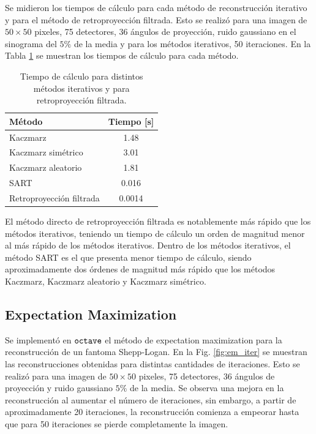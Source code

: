 \documentclass[letterpaper,12pt]{article}
\theoremstyle{plain}
\begin{document}
Se midieron los tiempos de cálculo para cada método de reconstrucción iterativo y para el método de retroproyección filtrada. Esto se realizó para una imagen de $50\times50$ pixeles, 75 detectores, 36 ángulos de proyección, ruido gaussiano en el sinograma del $5\%$ de la media y para los métodos iterativos, 50 iteraciones. En la Tabla \ref{tab:tiempos} se muestran los tiempos de cálculo para cada método. 

\begin{table}[H]
   \centering
   \begin{tabular}{l|c}
   \hline
   Método & Tiempo [s]  \\ \hline
   Kaczmarz & 1.48   \\ \hline
   Kaczmarz simétrico & 3.01   \\ \hline
   Kaczmarz aleatorio & 1.81   \\ \hline
   SART &  0.016   \\ \hline \hline
   Retroproyección filtrada & 0.0014   \\ \hline
   \end{tabular}
   \caption{Tiempo de cálculo para distintos métodos iterativos y para retroproyección filtrada.} 
   \label{tab:tiempos}
\end{table}

El método directo de retroproyección filtrada es notablemente más rápido que los métodos iterativos, teniendo un tiempo de cálculo un orden de magnitud menor al más rápido de los métodos iterativos. Dentro de los métodos iterativos, el método SART es el que presenta menor tiempo de cálculo, siendo aproximadamente dos órdenes de magnitud más rápido que los métodos Kaczmarz, Kaczmarz aleatorio y Kaczmarz simétrico.

\subsection{Expectation Maximization}

Se implementó en $\verb|octave|$ el método de expectation maximization para la reconstrucción de un fantoma Shepp-Logan. En la Fig. \ref{fig:em_iter} se muestran las reconstrucciones obtenidas para distintas cantidades de iteraciones. Esto se realizó para una imagen de $50\times50$ pixeles, 75 detectores, 36 ángulos de proyección y ruido gaussiano $5\%$ de la media. Se observa una mejora en la reconstrucción al aumentar el número de iteraciones, sin embargo, a partir de aproximadamente 20 iteraciones, la reconstrucción comienza a empeorar hasta que para 50 iteraciones se pierde completamente la imagen.
\end{document}
